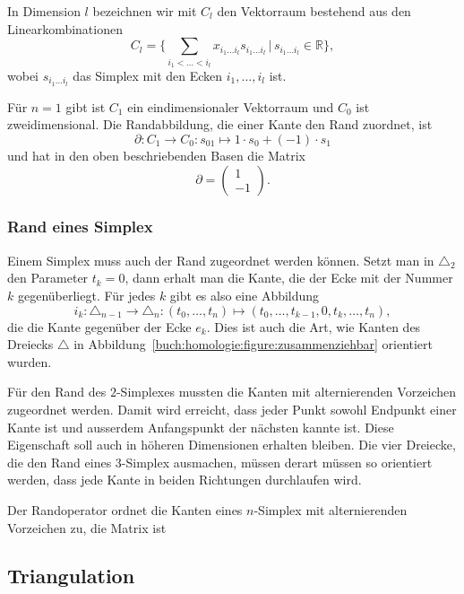 In Dimension $l$ bezeichnen wir mit $C_l$  den Vektorraum bestehend
aus den Linearkombinationen
\[
C_l
=
\biggl\{
\sum_{i_1<\dots<i_l} x_{i_1\dots i_l} s_{i_1\dots i_l}
\,
\bigg|
\,
s_{i_1\dots i_l}\in\mathbb{R}
\biggr\},
\]
wobei $s_{i_1\dots i_l}$ das Simplex mit den Ecken $i_1,\dots,i_l$ ist.

Für $n=1$ gibt ist $C_1$ ein eindimensionaler Vektorraum und $C_0$
ist zweidimensional.
Die Randabbildung, die einer Kante den Rand zuordnet, ist
\[
\partial
\colon 
C_1\to C_0
:
s_{01}
\mapsto
1\cdot s_0 + (-1)\cdot s_1
\]
und hat in den oben beschriebenden Basen die Matrix
\[
\partial 
=
\begin{pmatrix}
1\\
-1
\end{pmatrix}.
\]

\subsubsection{Rand eines Simplex}
Einem Simplex muss auch der Rand zugeordnet werden können.
Setzt man in $\triangle_2$ den Parameter $t_k=0$, dann erhalt man die Kante,
die der Ecke mit der Nummer $k$ gegenüberliegt.
Für jedes $k$ gibt es also eine Abbildung
\[
i_k
\colon
\triangle_{n-1} \to \triangle_n
:
(t_0,\dots,t_n)
\mapsto
(t_0,\dots,t_{k-1},0,t_{k},\dots,t_n),
\]
die die Kante gegenüber der Ecke $e_k$.
Dies ist auch die Art, wie Kanten des Dreiecks $\triangle$ 
in Abbildung~\ref{buch:homologie:figure:zusammenziehbar}
orientiert wurden.

Für den Rand des $2$-Simplexes mussten die Kanten mit alternierenden
Vorzeichen zugeordnet werden.
Damit wird erreicht, dass jeder Punkt sowohl Endpunkt einer Kante ist und
ausserdem Anfangspunkt der nächsten kannte ist.
Diese Eigenschaft soll auch in höheren Dimensionen erhalten bleiben.
Die vier Dreiecke, die den Rand eines $3$-Simplex ausmachen, müssen 
derart müssen so orientiert werden, dass jede Kante in beiden Richtungen
durchlaufen wird.

\begin{definition}
\label{buch:def:randoperator}
Der Randoperator ordnet die Kanten eines $n$-Simplex mit alternierenden
Vorzeichen zu, die Matrix ist
\[
\]
\end{definition}


\subsection{Triangulation
\label{buch:subsection:}}


